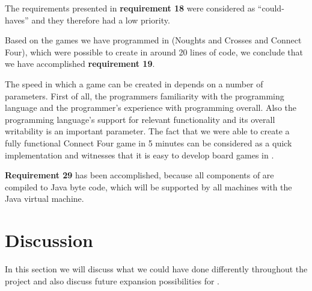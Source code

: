 The requirements presented in \textbf{requirement 18} were considered as
``could-haves'' and they therefore had a low priority.

Based on the games we have programmed in \productname{} (Noughts and Crosses
and Connect Four), which were possible to create in around 20 lines of code, we
conclude that we have accomplished \textbf{requirement 19}.

The speed in which a game can be created in \productname{} depends on a number
of parameters. First of all, the programmers familiarity with the programming
language and the programmer's experience with programming overall. Also the
programming language's support for relevant functionality and its overall
writability is an important parameter. The fact that we were able to create a
fully functional Connect Four game in 5 minutes can be considered as a quick
implementation and witnesses that it is easy to develop board games in
\productname{}.

\textbf{Requirement 29} has been accomplished, because all components of
\productname{} are compiled to Java byte code, which will be supported by all
machines with the Java virtual machine.

\section{Discussion}
\label{sec:discussion}

In this section we will discuss what we could have done differently throughout
the project and also discuss future expansion possibilities for \productname{}.

%







